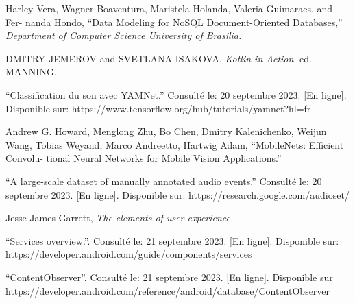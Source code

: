 \noindent [14] Harley Vera, Wagner Boaventura, Maristela Holanda, Valeria Guimaraes, and Fer-
nanda Hondo, “Data Modeling for NoSQL Document-Oriented Databases,” \textit{Department of Computer Science University of Brasilia.}

\noindent [15] DMITRY JEMEROV and SVETLANA ISAKOVA, \textit{Kotlin in Action}. ed. MANNING.

\noindent [16] “Classification du son avec YAMNet.” Consulté le: 20 septembre 2023. [En ligne]. Disponible sur: https://www.tensorflow.org/hub/tutorials/yamnet?hl=fr

\noindent [17] Andrew G. Howard, Menglong Zhu, Bo Chen, Dmitry Kalenichenko, Weijun Wang,
Tobias Weyand, Marco Andreetto, Hartwig Adam, “MobileNets: Efficient Convolu-
tional Neural Networks for Mobile Vision Applications.”

\noindent [18] “A large-scale dataset of manually annotated audio events.” Consulté le: 20 septembre 2023. [En ligne]. Disponible sur: https://research.google.com/audioset/

\noindent [19] Jesse James Garrett, \textit{The elements of user experience.}

\noindent [20] “Services overview.”. Consulté le: 21 septembre 2023. [En ligne]. Disponible sur: https://developer.android.com/guide/components/services

\noindent [21] “ContentObserver”.  Consulté le: 21 septembre 2023. [En ligne]. Disponible sur https://developer.android.com/reference/android/database/ContentObserver

\renewcommand\bibname{BIBLIOGRAPHIE}

